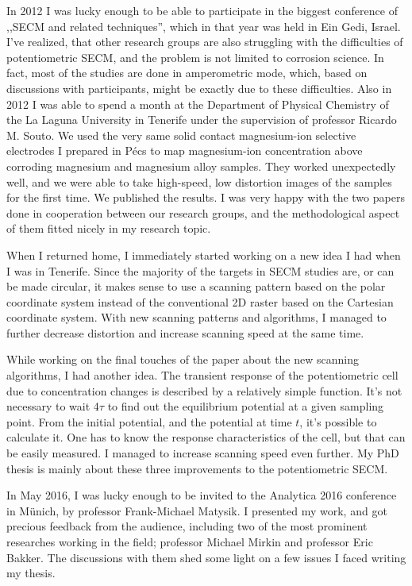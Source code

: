 In 2012 I was lucky enough to be able to participate in the biggest conference of ,,SECM and related techniques'', which in that year was held in Ein Gedi, Israel.
I've realized, that other research groups are also struggling with the difficulties of potentiometric SECM, and the problem is not limited to corrosion science.
In fact, most of the studies are done in amperometric mode, which, based on discussions with participants, might be exactly due to these difficulties.
Also in 2012 I was able to spend a month at the Department of Physical Chemistry of the La Laguna University in Tenerife under the supervision of professor Ricardo M. Souto.
We used the very same solid contact magnesium-ion selective electrodes I prepared in Pécs to map magnesium-ion concentration above corroding magnesium and magnesium alloy samples.
They worked unexpectedly well, and we were able to take high-speed, low distortion images of the samples for the first time.
We published the results.
I was very happy with the two papers done in cooperation between our research groups, and the methodological aspect of them fitted nicely in my research topic.

When I returned home, I immediately started working on a new idea I had when I was in Tenerife.
Since the majority of the targets in SECM studies are, or can be made circular, it makes sense to use a scanning pattern based on the polar coordinate system instead of the conventional 2D raster based on the Cartesian coordinate system.
With new scanning patterns and algorithms, I managed to further decrease distortion and increase scanning speed at the same time.

While working on the final touches of the paper about the new scanning algorithms, I had another idea.
The transient response of the potentiometric cell due to concentration changes is described by a relatively simple function.
It's not necessary to wait 4$\tau$ to find out the equilibrium potential at a given sampling point.
From the initial potential, and the potential at time $t$, it's possible to calculate it.
One has to know the response characteristics of the cell, but that can be easily measured.
I managed to increase scanning speed even further.
My PhD thesis is mainly about these three improvements to the potentiometric SECM.

In May 2016, I was lucky enough to be invited to the Analytica 2016 conference in Münich, by professor Frank-Michael Matysik.
I presented my work, and got precious feedback from the audience, including two of the most prominent researches working in the field; professor Michael Mirkin and professor Eric Bakker.
The discussions with them shed some light on a few issues I faced writing my thesis.

